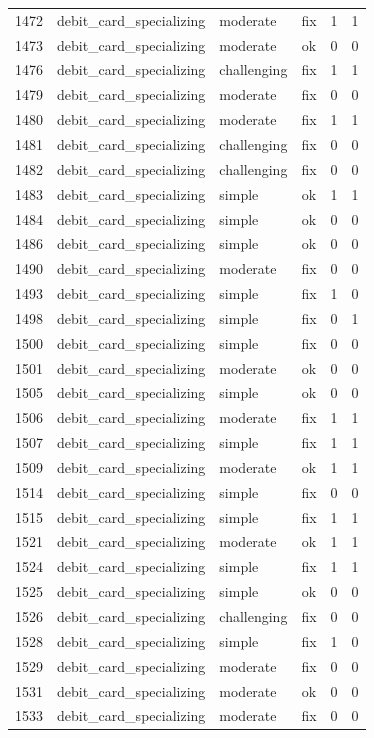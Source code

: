 \documentclass[11pt]{article}
\begin{document}
\begin{longtable}{lllccc}
1472 & debit\_card\_specializing & moderate & fix & 1 & 1 \\
1473 & debit\_card\_specializing & moderate & ok & 0 & 0 \\
1476 & debit\_card\_specializing & challenging & fix & 1 & 1 \\
1479 & debit\_card\_specializing & moderate & fix & 0 & 0 \\
1480 & debit\_card\_specializing & moderate & fix & 1 & 1 \\
1481 & debit\_card\_specializing & challenging & fix & 0 & 0 \\
1482 & debit\_card\_specializing & challenging & fix & 0 & 0 \\
1483 & debit\_card\_specializing & simple & ok & 1 & 1 \\
1484 & debit\_card\_specializing & simple & ok & 0 & 0 \\
1486 & debit\_card\_specializing & simple & ok & 0 & 0 \\
1490 & debit\_card\_specializing & moderate & fix & 0 & 0 \\
1493 & debit\_card\_specializing & simple & fix & 1 & 0 \\
1498 & debit\_card\_specializing & simple & fix & 0 & 1 \\
1500 & debit\_card\_specializing & simple & fix & 0 & 0 \\
1501 & debit\_card\_specializing & moderate & ok & 0 & 0 \\
1505 & debit\_card\_specializing & simple & ok & 0 & 0 \\
1506 & debit\_card\_specializing & moderate & fix & 1 & 1 \\
1507 & debit\_card\_specializing & simple & fix & 1 & 1 \\
1509 & debit\_card\_specializing & moderate & ok & 1 & 1 \\
1514 & debit\_card\_specializing & simple & fix & 0 & 0 \\
1515 & debit\_card\_specializing & simple & fix & 1 & 1 \\
1521 & debit\_card\_specializing & moderate & ok & 1 & 1 \\
1524 & debit\_card\_specializing & simple & fix & 1 & 1 \\
1525 & debit\_card\_specializing & simple & ok & 0 & 0 \\
1526 & debit\_card\_specializing & challenging & fix & 0 & 0 \\
1528 & debit\_card\_specializing & simple & fix & 1 & 0 \\
1529 & debit\_card\_specializing & moderate & fix & 0 & 0 \\
1531 & debit\_card\_specializing & moderate & ok & 0 & 0 \\
1533 & debit\_card\_specializing & moderate & fix & 0 & 0 \\
\end{longtable}
\end{document}
